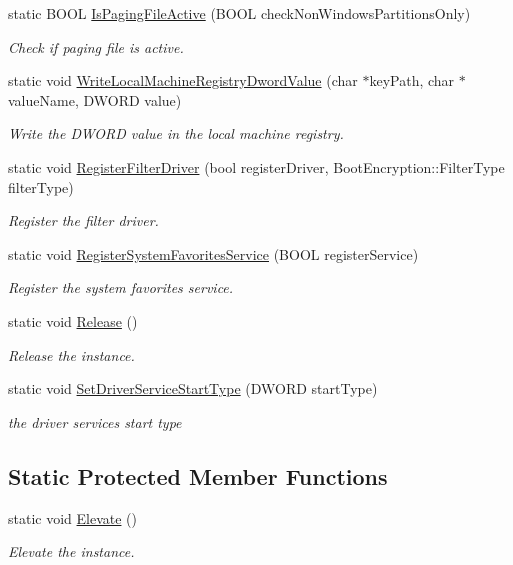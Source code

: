 \begin{DoxyCompactItemize}
static B\+O\+OL \hyperlink{class_gost_crypt_1_1_elevator_a2ebe7f1b09bc239343ec039ac6748543}{Is\+Paging\+File\+Active} (B\+O\+OL check\+Non\+Windows\+Partitions\+Only)
\begin{DoxyCompactList}\small\item\em Check if paging file is active. \end{DoxyCompactList}\item 
static void \hyperlink{class_gost_crypt_1_1_elevator_a4715568a6dfa5d681642b3ef420be6de}{Write\+Local\+Machine\+Registry\+Dword\+Value} (char $\ast$key\+Path, char $\ast$value\+Name, D\+W\+O\+RD value)
\begin{DoxyCompactList}\small\item\em Write the D\+W\+O\+RD value in the local machine registry. \end{DoxyCompactList}\item 
static void \hyperlink{class_gost_crypt_1_1_elevator_abef1824127048f32bb751dd1418d93d7}{Register\+Filter\+Driver} (bool register\+Driver, Boot\+Encryption\+::\+Filter\+Type filter\+Type)
\begin{DoxyCompactList}\small\item\em Register the filter driver. \end{DoxyCompactList}\item 
static void \hyperlink{class_gost_crypt_1_1_elevator_a9289f57f90900b6b46a8e930d84b24ad}{Register\+System\+Favorites\+Service} (B\+O\+OL register\+Service)
\begin{DoxyCompactList}\small\item\em Register the system favorites service. \end{DoxyCompactList}\item 
static void \hyperlink{class_gost_crypt_1_1_elevator_a911b8cbe1a7aa7e2aebb7aec14dce4f7}{Release} ()
\begin{DoxyCompactList}\small\item\em Release the instance. \end{DoxyCompactList}\item 
static void \hyperlink{class_gost_crypt_1_1_elevator_a7756cd9baaf29a8375bf42210961504d}{Set\+Driver\+Service\+Start\+Type} (D\+W\+O\+RD start\+Type)
\begin{DoxyCompactList}\small\item\em the driver services start type \end{DoxyCompactList}\end{DoxyCompactItemize}
\subsection*{Static Protected Member Functions}
\begin{DoxyCompactItemize}
\item 
static void \hyperlink{class_gost_crypt_1_1_elevator_a0b5a981fa1fa7f2b93f39c55a5ba20e1}{Elevate} ()
\begin{DoxyCompactList}\small\item\em Elevate the instance. \end{DoxyCompactList}\end{DoxyCompactItemize}
